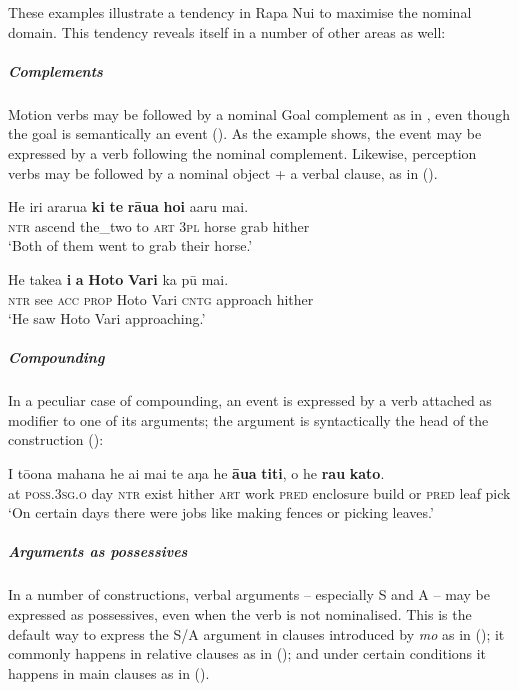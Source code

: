 These examples illustrate a tendency in Rapa Nui to maximise the nominal domain. This tendency reveals itself in a number of other areas as well:

\subparagraph{Complements} Motion verbs may be followed by a nominal Goal complement as in , even though the goal is semantically an event (). As the example shows, the event may be expressed by a verb following the nominal complement. Likewise, perception verbs may be followed by a nominal object + a verbal clause, as in  ().

\ea\label{ex:3.59}
\gll He iri ararua \textbf{ki} \textbf{te} \textbf{rāua} \textbf{hoi} {\ꞌ}a{\ꞌ}aru mai.\\
\textsc{ntr} ascend the\_two to \textsc{art} \textsc{3pl} horse grab hither\\

\glt 
‘Both of them went to grab their horse.’ \textstyleExampleref{[R170.002]} 
\z

\ea\label{ex:3.60}
\gll He take{\ꞌ}a \textbf{i} \textbf{a} \textbf{Hoto} \textbf{Vari} ka pū mai. \\
\textsc{ntr} see \textsc{acc} \textsc{prop} Hoto Vari \textsc{cntg} approach hither \\

\glt
‘He saw Hoto Vari approaching.’ \textstyleExampleref{[R304.004]} 
\z

\subparagraph{Compounding} In a peculiar case of compounding, an event is expressed by a verb attached as modifier to one of its arguments; the argument is syntactically the head of the construction ():

\ea\label{ex:3.61}
\gll {\ꞌ}I tō{\ꞌ}ona mahana he ai mai te aŋa he \textbf{{\ꞌ}āua} \textbf{titi},  {\ꞌ}o he \textbf{rau} \textbf{kato}.\\
at \textsc{poss.3sg.o} day \textsc{ntr} exist hither \textsc{art} work \textsc{pred} enclosure build  or \textsc{pred} leaf pick\\

\glt
‘On certain days there were jobs like making fences or picking leaves.’ \textstyleExampleref{[R380.084]} 
\z

\subparagraph{Arguments as possessives} In a number of constructions, verbal arguments – especially S and A – may be expressed as possessives, even when the verb is not nominalised. This is the default way to express the S/A argument in clauses introduced by \textit{m}\textit{o} as in  (); it commonly happens in relative clauses as in  (); and under certain conditions it happens in main clauses as in  ().

